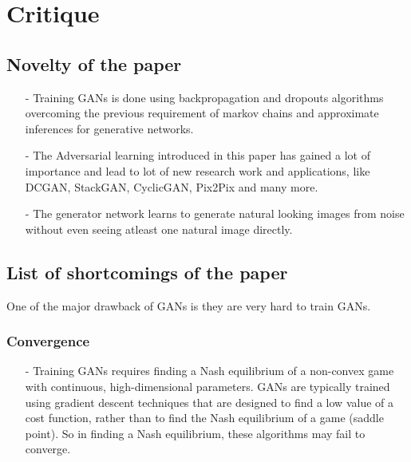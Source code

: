 \documentclass [11pt]{article}
\begin{document}
\section{Critique}

\vspace{0.5cm}

\subsection{Novelty of the paper}
\begin{itemize}
    \item[-] Training GANs is done using backpropagation and dropouts algorithms overcoming the previous requirement of markov chains and approximate inferences for generative networks.
    \item[-] The Adversarial learning introduced in this paper has gained a lot of importance and lead to lot of new research work and applications, like DCGAN, StackGAN, CyclicGAN, Pix2Pix and many more. 
    \item[-] The generator network learns to generate natural looking images from noise without even seeing atleast one natural image directly.
\end{itemize}

\vspace{0.5cm}

\subsection{List of shortcomings of the paper}

\vspace{0.5cm}

One of the major drawback of GANs is they are very hard to train GANs.
    
\subsubsection{Convergence}
\begin{itemize}
    \item[-] Training GANs requires finding a Nash equilibrium of a non-convex game with continuous, high-dimensional parameters. GANs are typically trained using gradient descent techniques that are designed to find a low value of a cost function, rather than to find the Nash equilibrium of a game (saddle point). So in finding a Nash equilibrium, these algorithms may fail to converge.
\end{itemize}
\end{document}
